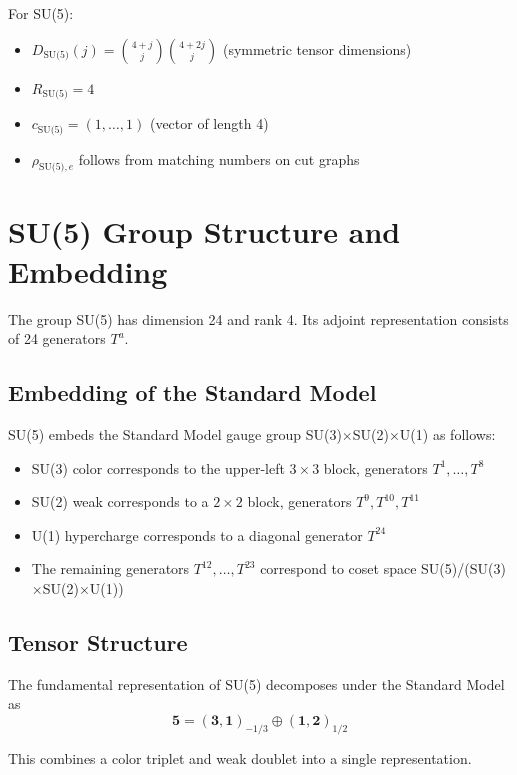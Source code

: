 \documentclass[11pt]{article}
\begin{document}
For SU(5):
\begin{itemize}
    \item $D_{\text{SU(5)}}(j) = \binom{4+j}{j}\binom{4+2j}{j}$ (symmetric tensor dimensions)
    \item $R_{\text{SU(5)}} = 4$
    \item $c_{\text{SU(5)}} = (1,\ldots,1)$ (vector of length 4)
    \item $\rho_{\text{SU(5)},e}$ follows from matching numbers on cut graphs
\end{itemize}

\section{SU(5) Group Structure and Embedding}

The group SU(5) has dimension 24 and rank 4. Its adjoint representation consists of 24 generators $T^a$.

\subsection{Embedding of the Standard Model}

SU(5) embeds the Standard Model gauge group SU(3)$\times$SU(2)$\times$U(1) as follows:
\begin{itemize}
    \item SU(3) color corresponds to the upper-left $3\times 3$ block, generators $T^1, \ldots, T^8$
    \item SU(2) weak corresponds to a $2\times 2$ block, generators $T^9, T^{10}, T^{11}$
    \item U(1) hypercharge corresponds to a diagonal generator $T^{24}$
    \item The remaining generators $T^{12}, \ldots, T^{23}$ correspond to coset space SU(5)/(SU(3)$\times$SU(2)$\times$U(1))
\end{itemize}

\subsection{Tensor Structure}
The fundamental representation of SU(5) decomposes under the Standard Model as
\begin{equation}
    \mathbf{5} = (\mathbf{3}, \mathbf{1})_{-1/3} \oplus (\mathbf{1}, \mathbf{2})_{1/2}
\end{equation}

This combines a color triplet and weak doublet into a single representation.
\end{document}

